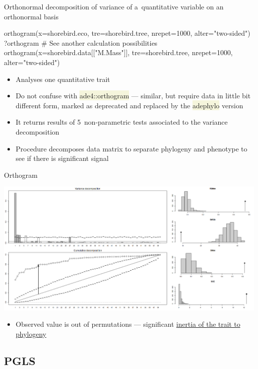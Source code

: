 \documentclass[compress, ucs, xelatex, 11pt, xcolor=svgnames, aspectratio=169,
	hyperref={
		bookmarks=true,
		unicode=true,
		colorlinks=true,
		pdftitle={Molecular data in R},
		plainpages=false,
		pdfauthor={Vojtech Zeisek},
		pdfsubject={Course about phylogeny and evolution in R},
		pdfcreator={XeLaTeX},
		pdfkeywords={R, evolution, phylogeny, molecular data},
		linkcolor=Crimson, %
		anchorcolor=Magenta, %
		citecolor=Magenta, %
		filecolor=Magenta, %
		menucolor=Magenta, %
		urlcolor=DodgerBlue, %
		pdftex},
	url={hyphens, lowtilde} %
	]{beamer}
\renewcommand{\texttt}[1]{\colorbox{Beige}{{\ttfamily #1}}}
\begin{document}
\begin{frame}[fragile]{Orthonormal decomposition of variance of a~quantitative variable on an orthonormal basis}
	\begin{spluscode}
    orthogram(x=shorebird.eco, tre=shorebird.tree, nrepet=1000,
      alter="two-sided")
    ?orthogram # See another calculation possibilities
    orthogram(x=shorebird.data[["M.Mass"]], tre=shorebird.tree, nrepet=1000,
      alter="two-sided")
	\end{spluscode}
	\begin{itemize}
		\item Analyses one quantitative trait
		\item Do not confuse with \texttt{ade4::orthogram} --- similar, but require data in little bit different form, marked as deprecated and replaced by the \texttt{adephylo} version
		\item It returns results of 5~non-parametric tests associated to the variance decomposition
		\item Procedure decomposes data matrix to separate phylogeny and phenotype to see if there is significant signal
	\end{itemize}
\end{frame}

\begin{frame}{Orthogram}
	\begin{center}
		\includegraphics[width=\textwidth-4cm]{orthogram.png}
	\end{center}
	\begin{itemize}
		\item Observed value is out of permutations --- significant \href{https://en.wikipedia.org/wiki/Phylogenetic_inertia}{inertia of the trait to phylogeny}
	\end{itemize}
\end{frame}

\subsection{PGLS}
\end{document}
